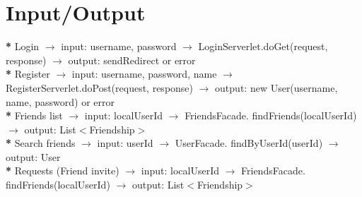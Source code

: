 \section{Input/Output}

\textbf{*} Login \begin{math}\to\end{math} input: username, password \begin{math}\to\end{math} LoginServerlet.doGet(request, response) \begin{math}\to\end{math} output: sendRedirect or error\\

\textbf{*} Register \begin{math}\to\end{math} input: username, password, name \begin{math}\to\end{math} RegisterServerlet.doPost(request, response) \begin{math}\to\end{math} output: new User(username, name, password) or error\\

\textbf{*} Friends list \begin{math}\to\end{math} input: localUserId \begin{math}\to\end{math} FriendsFacade. findFriends(localUserId) \begin{math}\to\end{math} output: List\begin{math}<\end{math}Friendship\begin{math}>\end{math}\\

\textbf{*} Search friends \begin{math}\to\end{math} input: userId \begin{math}\to\end{math} UserFacade. findByUserId(userId) \begin{math}\to\end{math} output: User\\

\textbf{*} Requests (Friend invite) \begin{math}\to\end{math}  input: localUserId \begin{math}\to\end{math} FriendsFacade. findFriends(localUserId) \begin{math}\to\end{math} output: List\begin{math}<\end{math}Friendship\begin{math}>\end{math}\\

